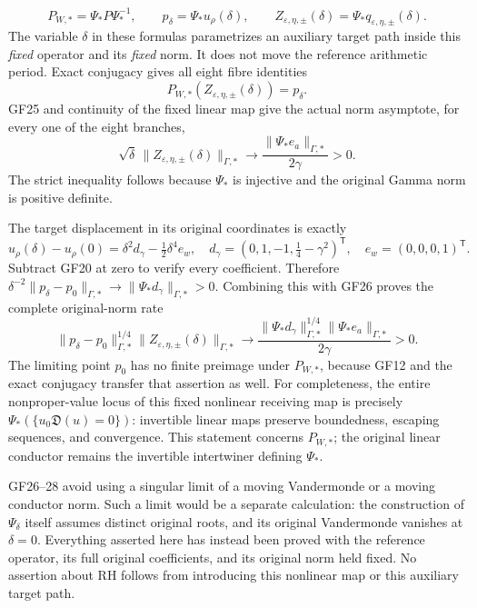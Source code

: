 \[
 P_{W,*}=\Psi_*P\Psi_*^{-1},\qquad
 p_\delta=\Psi_*u_\rho(\delta),\qquad
 Z_{\varepsilon,\eta,\pm}(\delta)
              =\Psi_*q_{\varepsilon,\eta,\pm}(\delta).
\]
The variable $\delta$ in these formulas parametrizes an auxiliary
target path inside this \emph{fixed} operator and its \emph{fixed}
norm. It does not move the reference arithmetic period. Exact
conjugacy gives all eight fibre identities
\[
 P_{W,*}(Z_{\varepsilon,\eta,\pm}(\delta))=p_\delta.
\]
GF25 and continuity of the fixed linear map give the actual norm
asymptote, for every one of the eight branches,
\begin{equation}
 \sqrt\delta\,\|Z_{\varepsilon,\eta,\pm}(\delta)\|_{\Gamma,*}
       \longrightarrow\frac{\|\Psi_*e_a\|_{\Gamma,*}}{2\gamma}>0.
 \tag{GF26}
\end{equation}
The strict inequality follows because $\Psi_*$ is injective and
the original Gamma norm is positive definite.

The target displacement in its original coordinates is exactly
\begin{equation}
 u_\rho(\delta)-u_\rho(0)
 =\delta^2 d_\gamma-\tfrac12\delta^4e_w,
 \quad d_\gamma=(0,1,-1,\tfrac14-\gamma^2)^{\mathsf T},
 \quad e_w=(0,0,0,1)^{\mathsf T}.\tag{GF27}
\end{equation}
Subtract GF20 at zero to verify every coefficient. Therefore
$\delta^{-2}\|p_\delta-p_0\|_{\Gamma,*}
\to\|\Psi_*d_\gamma\|_{\Gamma,*}>0$.
Combining this with GF26 proves the complete original-norm rate
\begin{equation}
 \boxed{\quad
 \|p_\delta-p_0\|_{\Gamma,*}^{1/4}
 \|Z_{\varepsilon,\eta,\pm}(\delta)\|_{\Gamma,*}
 \longrightarrow
 \frac{\|\Psi_*d_\gamma\|_{\Gamma,*}^{1/4}
       \|\Psi_*e_a\|_{\Gamma,*}}{2\gamma}>0.
 \quad}\tag{GF28}
\end{equation}
The limiting point $p_0$ has no finite preimage under $P_{W,*}$,
because GF12 and the exact conjugacy transfer that assertion as
well. For completeness, the entire nonproper-value locus of this
fixed nonlinear receiving map is precisely
$\Psi_*(\{u_0\mathfrak D(u)=0\})$: invertible linear maps preserve
boundedness, escaping sequences, and convergence. This statement
concerns $P_{W,*}$; the original linear conductor remains the
invertible intertwiner defining $\Psi_*$.

GF26--28 avoid using a singular limit of a moving Vandermonde or a
moving conductor norm. Such a limit would be a separate calculation:
the construction of $\Psi_\delta$ itself assumes distinct original
roots, and its original Vandermonde vanishes at $\delta=0$.
Everything asserted here has instead been proved with the reference
operator, its full original coefficients, and its original norm held
fixed. No assertion about RH follows from introducing this nonlinear
map or this auxiliary target path.

